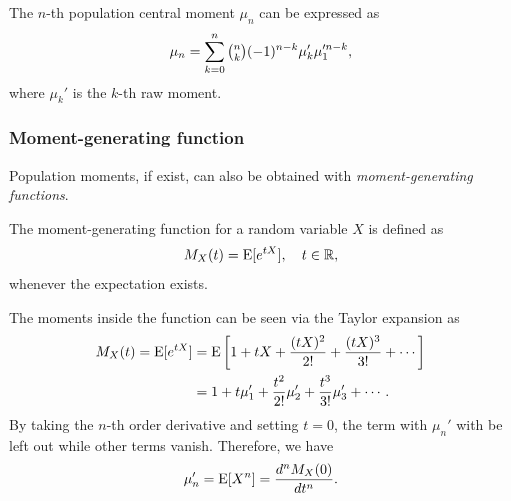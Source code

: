 \begin{thm}
The $ n $-th population central moment $ \mu_n $ can be expressed as 
\[ \mu_n = \sum_{k=0}^n \tbinom nk (-1)^{n-k} \mu_k' \mu_1'^{n-k}, \]
where $ \mu_k' $ is the $ k $-th raw moment. 
\end{thm}

\subsubsection{Moment-generating function}
Population moments, if exist, can also be obtained with \textit{moment-generating functions}. 

\begin{defn}
The moment-generating function for a random variable $ X $ is defined as 
\[ M_X(t) = \E[e^{tX}],\quad t \in \mathbb{R}, \]
whenever the expectation exists.
\end{defn}

The moments inside the function can be seen via the Taylor expansion as 
\begin{align*}
M_X(t) = \E[e^{tX}] &= \E \left [ 1+tX+\frac{(tX)^2}{2!} + \frac{(tX)^3}{3!} + \cdots \right ] \\
&= 1+ t\mu_1' + \frac{t^2}{2!} \mu_2' + \frac{t^3}{3!} \mu_3' + \cdots .
\end{align*}
By taking the $ n $-th order derivative and setting $ t=0 $, the term with $ \mu_n' $  with be left out while other terms vanish. Therefore, we have
\begin{equation}
\mu_n' = \E[X^n] = \frac{d^n M_X(0)}{dt^n}.
\end{equation}






